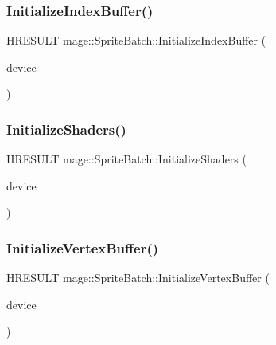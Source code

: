 \subsubsection{\texorpdfstring{Initialize\+Index\+Buffer()}{InitializeIndexBuffer()}}
{\footnotesize\ttfamily H\+R\+E\+S\+U\+LT mage\+::\+Sprite\+Batch\+::\+Initialize\+Index\+Buffer (\begin{DoxyParamCaption}\item[{\hyperlink{namespacemage_ae74f374780900893caa5555d1031fd79}{Com\+Ptr}$<$ I\+D3\+D11\+Device2 $>$}]{device }\end{DoxyParamCaption})\hspace{0.3cm}{\ttfamily [private]}}

\hypertarget{classmage_1_1_sprite_batch_aaa79d83f88c8899e455cdc0936fce3ab}{}\label{classmage_1_1_sprite_batch_aaa79d83f88c8899e455cdc0936fce3ab} 
\subsubsection{\texorpdfstring{Initialize\+Shaders()}{InitializeShaders()}}
{\footnotesize\ttfamily H\+R\+E\+S\+U\+LT mage\+::\+Sprite\+Batch\+::\+Initialize\+Shaders (\begin{DoxyParamCaption}\item[{\hyperlink{namespacemage_ae74f374780900893caa5555d1031fd79}{Com\+Ptr}$<$ I\+D3\+D11\+Device2 $>$}]{device }\end{DoxyParamCaption})\hspace{0.3cm}{\ttfamily [private]}}

\hypertarget{classmage_1_1_sprite_batch_a2d489578d466293c77818d541cf18106}{}\label{classmage_1_1_sprite_batch_a2d489578d466293c77818d541cf18106} 
\subsubsection{\texorpdfstring{Initialize\+Vertex\+Buffer()}{InitializeVertexBuffer()}}
{\footnotesize\ttfamily H\+R\+E\+S\+U\+LT mage\+::\+Sprite\+Batch\+::\+Initialize\+Vertex\+Buffer (\begin{DoxyParamCaption}\item[{\hyperlink{namespacemage_ae74f374780900893caa5555d1031fd79}{Com\+Ptr}$<$ I\+D3\+D11\+Device2 $>$}]{device }\end{DoxyParamCaption})\hspace{0.3cm}{\ttfamily [private]}}

